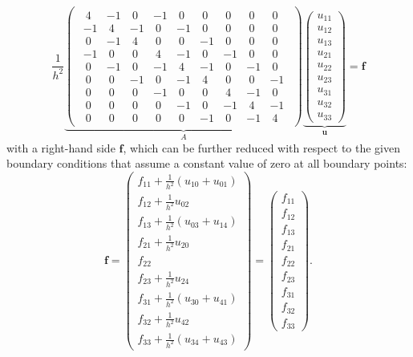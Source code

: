 \begin{equation}
\frac{1}{h^2} \underbrace{ \begin{pmatrix}
\begin{array}{ccc|ccc|ccc}~4&-1&~0&-1&~0&~0&~0&~0&~0\\-1&~4&-1&~0&-1&~0&~0&~0&~0\\~0&-1&~4&~0&~0&-1&~0&~0&~0\\\hline -1&~0&~0&~4&-1&~0&-1&~0&~0\\~0&-1&~0&-1&~4&-1&~0&-1&~0\\~0&~0&-1&~0&-1&~4&~0&~0&-1\\\hline ~0&~0&~0&-1&~0&~0&~4&-1&~0\\~0&~0&~0&~0&-1&~0&-1&~4&-1\\~0&~0&~0&~0&~0&-1&~0&-1&~4\end{array}
	\end{pmatrix}}_{\textstyle A}
\underbrace{
	\begin{pmatrix}
	u_{11} \\ u_{12} \\ u_{13} \\ u_{21} \\ u_{22} \\ u_{23} \\ u_{31} \\ u_{32} \\ u_{33}
\end{pmatrix}}_{\textstyle{\bm{u}}} = \bm f
\end{equation}
with a right-hand side $\bm f$, which can be further reduced with respect to the given boundary conditions that assume a constant value of zero at all boundary points:
\begin{equation}
\bm f = \begin{pmatrix}
		f_{11} + \frac{1}{h^2} (u_{10} + u_{01}) \\f_{12} + \frac{1}{h^2} u_{02} \\ f_{13} + \frac{1}{h^2} (u_{03} + u_{14})  \\ f_{21} + \frac{1}{h^2} u_{20} \\ f_{22} \\ f_{23} + \frac{1}{h^2} u_{24} \\ f_{31} + \frac{1}{h^2} (u_{30} + u_{41}) \\ f_{32} + \frac{1}{h^2} u_{42} \\ f_{33} + \frac{1}{h^2} (u_{34} + u_{43})
\end{pmatrix} = \begin{pmatrix}
f_{11} \\
f_{12} \\ 
f_{13} \\ 
f_{21} \\ 
f_{22} \\
f_{23} \\
f_{31} \\ 
f_{32} \\
f_{33}
\end{pmatrix}.
\label{eq:2D-poisson-assembled-rhs}
\end{equation}
